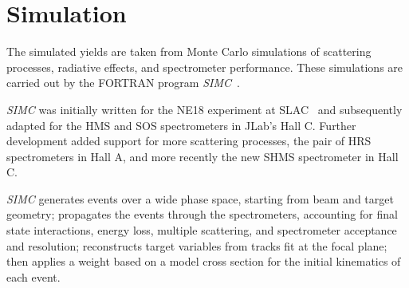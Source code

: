 \section{Simulation}
The simulated yields are taken from Monte Carlo simulations of scattering
processes, radiative effects, and spectrometer performance.
These simulations are carried out by the FORTRAN program
\textit{SIMC}~\cite{simc_github, simc_wiki}.


\textit{SIMC} was initially written for the NE18 experiment at
SLAC~\cite{Makins_1994} and subsequently adapted for the HMS and SOS
spectrometers in JLab's Hall C.
Further development added support for more scattering processes, the pair of
HRS spectrometers in Hall A, and more recently the new SHMS spectrometer in
Hall C.


\textit{SIMC} generates events over a wide phase space, starting from beam and
target geometry; propagates the events through the spectrometers, accounting
for final state interactions, energy loss, multiple scattering, and
spectrometer acceptance and resolution; reconstructs target variables from
tracks fit at the focal plane; then applies a weight based on a model cross
section for the initial kinematics of each event.



